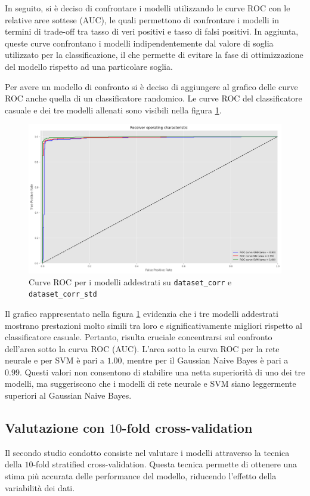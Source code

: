In seguito, si è deciso di confrontare i modelli utilizzando le curve ROC con
le relative aree sottese (AUC), le quali permettono di confrontare i modelli in
termini di trade-off tra tasso di veri positivi e tasso di falsi positivi. In
aggiunta, queste curve confrontano i modelli indipendentemente dal valore di
soglia utilizzato per la classificazione, il che permette di evitare la fase di
ottimizzazione del modello rispetto ad una particolare soglia.

Per avere un modello di confronto si è deciso di aggiungere al grafico delle
curve ROC anche quella di un classificatore randomico. Le curve ROC del
classificatore casuale e dei tre modelli allenati sono visibili nella figura
\ref{fig:roc_curve_corr}.
\begin{figure}[!ht]
    \centering
    \includegraphics[width=\textwidth]{img/ris/roc_curve_corr.png}
    \caption{Curve ROC per i modelli addestrati su \texttt{dataset\_corr} e \texttt{dataset\_corr\_std}}
    \label{fig:roc_curve_corr}
\end{figure}

Il grafico rappresentato nella figura \ref{fig:roc_curve_corr} evidenzia che i
tre modelli addestrati mostrano prestazioni molto simili tra loro e
significativamente migliori rispetto al classificatore casuale. Pertanto, risulta
cruciale concentrarsi sul confronto dell'area sotto la curva ROC (AUC). L'area
sotto la curva ROC per la rete neurale e per SVM è pari a $1.00$, mentre per il
Gaussian Naive Bayes è pari a $0.99$. Questi valori non consentono di stabilire
una netta superiorità di uno dei tre modelli, ma suggeriscono che i modelli di
rete neurale e SVM siano leggermente superiori al Gaussian Naive Bayes.
\subsection*{Valutazione con $10$-fold cross-validation}
Il secondo studio condotto consiste nel valutare i modelli attraverso la tecnica
della $10$-fold stratified cross-validation. Questa tecnica permette di ottenere
una stima più accurata delle performance del modello, riducendo l'effetto della
variabilità dei dati.

